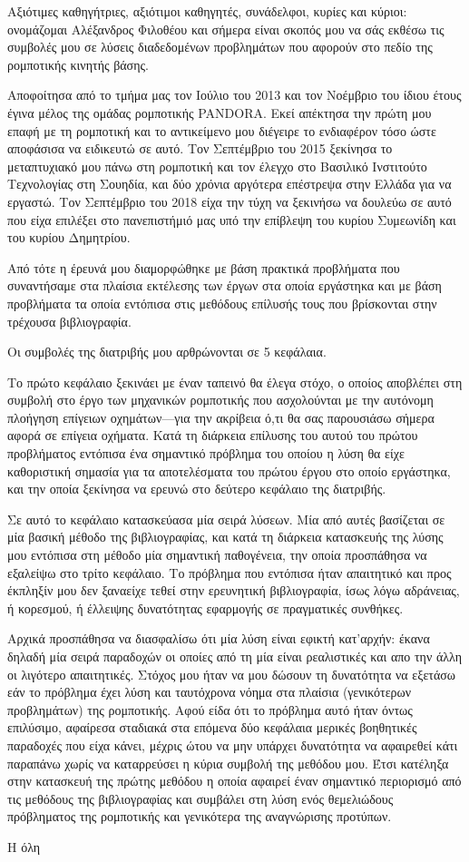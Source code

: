 \documentclass[a4paper,10pt]{article}
\begin{document}
Αξιότιμες καθηγήτριες, αξιότιμοι καθηγητές, συνάδελφοι, κυρίες και κύριοι:
ονομάζομαι Αλέξανδρος Φιλοθέου και σήμερα είναι σκοπός μου να σάς εκθέσω τις
συμβολές μου σε λύσεις διαδεδομένων προβλημάτων που αφορούν στο πεδίο της
ρομποτικής κινητής βάσης.

Αποφοίτησα από το τμήμα μας τον Ιούλιο του 2013 και τον Νοέμβριο του ίδιου
έτους έγινα μέλος της ομάδας ρομποτικής PANDORA. Εκεί απέκτησα την πρώτη μου
επαφή με τη ρομποτική και το αντικείμενο μου διέγειρε το ενδιαφέρον τόσο ώστε
αποφάσισα να ειδικευτώ σε αυτό. Τον Σεπτέμβριο του 2015 ξεκίνησα το
μεταπτυχιακό μου πάνω στη ρομποτική και τον έλεγχο στο Βασιλικό Ινστιτούτο
Τεχνολογίας στη Σουηδία, και δύο χρόνια αργότερα επέστρεψα στην Ελλάδα για να
εργαστώ. Τον Σεπτέμβριο του 2018 είχα την τύχη να ξεκινήσω να δουλεύω σε αυτό
που είχα επιλέξει στο πανεπιστήμιό μας υπό την επίβλεψη του κυρίου Συμεωνίδη
και του κυρίου Δημητρίου.

Από τότε η έρευνά μου διαμορφώθηκε με βάση πρακτικά προβλήματα που
συναντήσαμε στα πλαίσια εκτέλεσης των έργων στα οποία εργάστηκα και με βάση
προβλήματα τα οποία εντόπισα στις μεθόδους επίλυσής τους που βρίσκονται στην
τρέχουσα βιβλιογραφία.

Οι συμβολές της διατριβής μου αρθρώνονται σε 5 κεφάλαια.

Το πρώτο κεφάλαιο ξεκινάει με έναν ταπεινό θα έλεγα στόχο, ο οποίος αποβλέπει
στη συμβολή στο έργο των μηχανικών ρομποτικής που ασχολούνται με την αυτόνομη
πλοήγηση επίγειων οχημάτων---για την ακρίβεια ό,τι θα σας παρουσιάσω σήμερα
αφορά σε επίγεια οχήματα. Κατά τη διάρκεια επίλυσης του αυτού του πρώτου
προβλήματος εντόπισα ένα σημαντικό πρόβλημα του οποίου η λύση θα είχε
καθοριστική σημασία για τα αποτελέσματα του πρώτου έργου στο οποίο εργάστηκα,
και την οποία ξεκίνησα να ερευνώ στο δεύτερο κεφάλαιο της διατριβής.

Σε αυτό το κεφάλαιο κατασκεύασα μία σειρά λύσεων. Μία από αυτές βασίζεται σε
μία βασική μέθοδο της βιβλιογραφίας, και κατά τη διάρκεια κατασκευής της λύσης
μου εντόπισα στη μέθοδο μία σημαντική παθογένεια, την οποία προσπάθησα να
εξαλείψω στο τρίτο κεφάλαιο. Το πρόβλημα που εντόπισα ήταν απαιτητικό και προς
έκπληξίν μου δεν ξαναείχε τεθεί στην ερευνητική βιβλιογραφία, ίσως λόγω
αδράνειας, ή κορεσμού, ή έλλειψης δυνατότητας εφαρμογής σε πραγματικές συνθήκες.

Αρχικά προσπάθησα να διασφαλίσω ότι μία λύση είναι εφικτή κατ'αρχήν: έκανα
δηλαδή μία σειρά παραδοχών οι οποίες από τη μία είναι ρεαλιστικές και απο την
άλλη οι λιγότερο απαιτητικές. Στόχος μου ήταν να μου δώσουν τη δυνατότητα να
εξετάσω εάν το πρόβλημα έχει λύση και ταυτόχρονα νόημα στα πλαίσια (γενικότερων
προβλημάτων) της ρομποτικής. Αφού είδα ότι το πρόβλημα αυτό ήταν όντως
επιλύσιμο, αφαίρεσα σταδιακά στα επόμενα δύο κεφάλαια μερικές βοηθητικές
παραδοχές που είχα κάνει, μέχρις ώτου να μην υπάρχει δυνατότητα να αφαιρεθεί
κάτι παραπάνω χωρίς να καταρρεύσει η κύρια συμβολή της μεθόδου μου. Έτσι
κατέληξα στην κατασκευή της πρώτης μεθόδου η οποία αφαιρεί έναν σημαντικό
περιορισμό από τις μεθόδους της βιβλιογραφίας και συμβάλει στη λύση ενός
θεμελιώδους πρόβληματος της ρομποτικής και γενικότερα της αναγνώρισης προτύπων.




Η όλη
\end{document}

